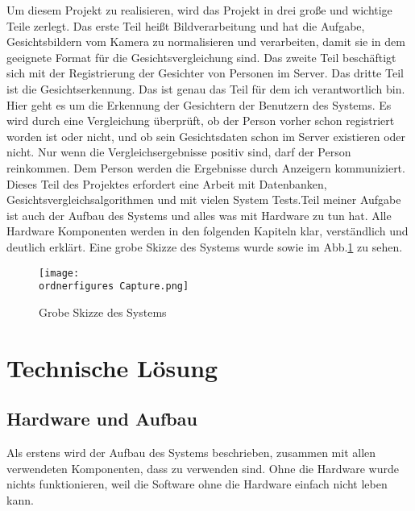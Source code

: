Um diesem Projekt zu realisieren, wird das Projekt in drei große und wichtige Teile zerlegt. Das erste Teil heißt Bildverarbeitung und hat die Aufgabe, Gesichtsbildern vom Kamera zu normalisieren und verarbeiten, damit sie in dem geeignete Format für die Gesichtsvergleichung sind. Das zweite Teil beschäftigt sich mit der Registrierung der Gesichter von Personen im Server. Das dritte Teil ist die Gesichtserkennung. Das ist genau das Teil für dem ich verantwortlich bin. Hier geht es um die Erkennung der Gesichtern der Benutzern des Systems. Es wird durch eine Vergleichung überprüft, ob der Person vorher schon registriert worden ist oder nicht, und ob sein Gesichtsdaten schon im Server existieren oder nicht. Nur wenn die Vergleichsergebnisse positiv sind, darf der Person reinkommen. %
Dem Person werden die Ergebnisse durch Anzeigern kommuniziert. Dieses Teil des Projektes erfordert eine Arbeit mit Datenbanken, Gesichtsvergleichsalgorithmen und mit vielen System Tests.Teil meiner Aufgabe ist auch der Aufbau des Systems und alles was mit Hardware zu tun hat. Alle Hardware Komponenten werden in den folgenden Kapiteln klar, verständlich und deutlich erklärt. Eine grobe Skizze des Systems wurde sowie im Abb.\ref{fig:grobe_Skizze} zu sehen.
\begin{figure}[H]
	\texttt{[image: \\ordnerfigures Capture.png]}
	\caption{Grobe Skizze des Systems}
	\label{fig:grobe_Skizze}
\end{figure}
\section{Technische Lösung}
	\subsection{Hardware und Aufbau}
Als erstens wird der Aufbau des Systems beschrieben, zusammen mit allen verwendeten Komponenten, dass zu verwenden sind. Ohne die Hardware wurde nichts funktionieren, weil die Software ohne die Hardware einfach nicht leben kann. 

